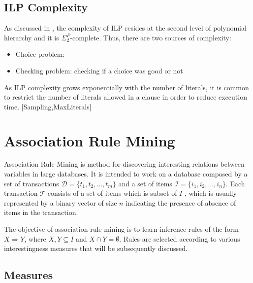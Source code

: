 \subsection{ILP Complexity}

As discussed in \cite{DBLP:journals/ngc/GottlobLS99}, the complexity of ILP resides at the second level of polynomial
hierarchy and it is $\Sigma_2^P$-complete. Thus, there are two sources of complexity:
\begin{itemize}
 \item Choice problem: 
 \item Checking problem: checking if a choice was good or not
\end{itemize}


As ILP complexity grows exponentially with the number of literals, it is common to restrict the number of literals
allowed in a clause in order to reduce execution time.
[Sampling,MaxLiterals]



\section{Association Rule Mining}
\label{sec:rw-arm}
\cite{Agrawal:1993:MAR:170036.170072}
\cite{Hipp00algorithmsfor}

Association Rule Mining is method for discovering interesting relations between variables in large databases. It is
intended to work on a database composed by a set of transactions $\mathcal{D}=\{t_1,t_2,\ldots,t_m\}$ and a set of
items
$\mathcal{I}=\{i_1,i_2,\ldots,i_n\}$. Each transaction $\mathcal{T}$ consists of a set of items which is subset of $I$
,
which is usually represented by a binary vector of size $n$ indicating the presence of absence of items in the
transaction.

The objective of association rule mining is to learn inference rules of the form $X \Rightarrow Y$, where $X,Y
\subseteq I$ and $X \cap Y = \emptyset$. Rules are selected according to various interestingness measures that will be
subsequently discussed.

\subsection{Measures}

